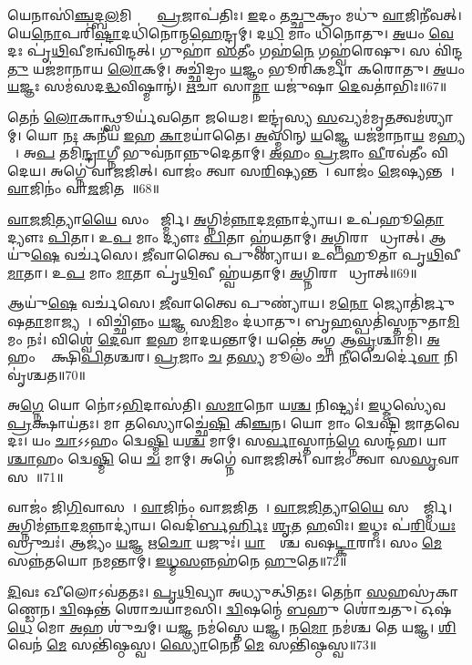 𑌯𑍇𑌨𑌾𑌸𑌿॑\ul{𑌞𑍍𑌚}𑌦𑍍𑌬\ul{𑌲}𑌮𑌿𑌨𑍍𑌦𑍍𑌰𑍇᳚ \ul{𑌪𑍍𑌰}𑌜𑌾𑌪॑𑌤𑌿𑌃।
\ul{𑌇}𑌦𑌂 𑌤\ul{𑌚𑍍𑌛𑍁}𑌕𑍍𑌰𑌂 𑌮𑌧𑍁॑ \ul{𑌵𑌾}𑌜𑌿𑌨𑍀॑𑌵𑌤𑍍।
𑌯𑍇\ul{𑌨𑍋}𑌪𑌰𑌿॑\ul{𑌷𑍍𑌟𑌾}𑌦𑌧𑌿॑𑌨𑍋𑌨𑍍𑌮\ul{𑌹𑍇}𑌨𑍍𑌦𑍍𑌰𑌮𑍍।
𑌦\ul{𑌧𑌿} 𑌮𑌾𑌂 𑌧𑌿॑𑌨𑍋𑌤𑍁।
\ul{𑌅}𑌯𑌂 \ul{𑌵𑍇}𑌦𑌃 𑌪𑍃॑\ul{𑌥𑌿}𑌵𑍀𑌮𑌨𑍍𑌵॑𑌵𑌿𑌨𑍍𑌦𑌤𑍍।
𑌗𑍁𑌹𑌾॑ \ul{𑌸}𑌤𑍀𑌂 𑌗𑌹॑\ul{𑌨𑍇} 𑌗𑌹𑍍𑌵॑𑌰𑍇𑌷𑍁।
𑌸 𑌵𑌿॑𑌨𑍍𑌦\ul{𑌤𑍁} 𑌯𑌜॑𑌮𑌾𑌨𑌾𑌯 \ul{𑌲𑍋}𑌕𑌮𑍍।
𑌅𑌚𑍍𑌛𑌿॑𑌦𑍍𑌰𑌂 \ul{𑌯}𑌜𑍍𑌞𑌂 𑌭𑍂𑌰𑌿॑𑌕𑌰𑍍𑌮𑌾 𑌕𑌰𑍋𑌤𑍁।
\ul{𑌅}𑌯𑌂 \ul{𑌯}𑌜𑍍𑌞𑌃 𑌸𑌮॑𑌸𑌦\ul{𑌦𑍍𑌧}𑌵𑌿𑌷𑍍𑌮𑌾𑌨𑍍॑।
\ul{𑌋}𑌚𑌾 𑌸𑌾\ul{𑌮𑍍𑌨𑌾} 𑌯𑌜𑍁॑𑌷𑌾 \ul{𑌦𑍇}𑌵𑌤𑌾॑𑌭𑌿𑌃॥67॥

𑌤𑍇𑌨॑ \ul{𑌲𑍋}𑌕𑌾𑌨𑍍𑌥𑍍𑌸𑍂𑌰𑍍𑌯॑𑌵𑌤𑍋 𑌜𑌯𑍇𑌮।
𑌇𑌨𑍍𑌦𑍍𑌰॑𑌸𑍍𑌯 \ul{𑌸}𑌖𑍍𑌯𑌮॑𑌮𑍃\ul{𑌤}𑌤𑍍𑌵𑌮॑𑌶𑍍𑌯𑌾𑌮𑍍।
𑌯𑍋 \ul{𑌨𑌃} 𑌕𑌨𑍀॑𑌯 \ul{𑌇}𑌹 \ul{𑌕𑌾}𑌮𑌯𑌾॑𑌤𑍈।
\ul{𑌅}𑌸𑍍𑌮𑌿𑌨𑍍 \ul{𑌯}𑌜𑍍𑌞𑍇 𑌯𑌜॑𑌮𑌾𑌨𑌾\ul{𑌯} 𑌮𑌹𑍍𑌯𑌮𑍍᳚।
𑌅\ul{𑌪} 𑌤𑌮𑌿॑\ul{𑌨𑍍𑌦𑍍𑌰𑌾}𑌗𑍍𑌨𑍀 𑌭𑍁𑌵॑𑌨𑌾𑌨𑍍𑌨𑍁𑌦𑍇𑌤𑌾𑌮𑍍।
\ul{𑌅}𑌹𑌂 \ul{𑌪𑍍𑌰}𑌜𑌾𑌂 \ul{𑌵𑍀}𑌰𑌵॑𑌤𑍀𑌂 𑌵𑌿𑌦𑍇𑌯।
𑌅𑌗𑍍𑌨𑍇॑ 𑌵𑌾𑌜𑌜𑌿𑌤𑍍।
𑌵𑌾𑌜𑌂॑ 𑌤𑍍𑌵𑌾 𑌸\ul{𑌰𑌿}𑌷𑍍𑌯𑌨𑍍𑌤𑌮𑍍᳚।
𑌵𑌾𑌜𑌂॑ \ul{𑌜𑍇}𑌷𑍍𑌯𑌨𑍍𑌤𑌮𑍍᳚।
\ul{𑌵𑌾}𑌜𑌿𑌨𑌂॑ 𑌵𑌾\ul{𑌜}𑌜𑌿𑌤𑌮𑍍᳚॥68॥

\ul{𑌵𑌾}\ul{𑌜}\ul{𑌜𑌿}𑌤𑍍𑌯𑌾\ul{𑌯𑍈} 𑌸𑌂 𑌮𑌾᳚𑌰𑍍𑌜𑍍𑌮𑌿।
\ul{𑌅}𑌗𑍍𑌨𑌿𑌮॑\ul{𑌨𑍍𑌨𑌾}𑌦\ul{𑌮}𑌨𑍍𑌨𑌾𑌦𑍍𑌯𑌾॑𑌯।
𑌉𑌪॑𑌹𑍂\ul{𑌤𑍋} 𑌦𑍍𑌯𑍗𑌃 \ul{𑌪𑌿}𑌤𑌾।
𑌉\ul{𑌪} 𑌮𑌾𑌂 𑌦𑍍𑌯𑍗𑌃 \ul{𑌪𑌿}𑌤𑌾 𑌹𑍍𑌵॑𑌯𑌤𑌾𑌮𑍍।
\ul{𑌅}𑌗𑍍𑌨𑌿𑌰𑌾𑌗𑍍𑌨𑍀᳚𑌧𑍍𑌰𑌾𑌤𑍍।
𑌆𑌯𑍁॑\ul{𑌷𑍇} 𑌵𑌰𑍍𑌚॑𑌸𑍇।
\ul{𑌜𑍀}𑌵𑌾𑌤𑍍𑌵𑍈 𑌪𑍁𑌣𑍍𑌯𑌾॑𑌯।
𑌉𑌪॑𑌹𑍂𑌤𑌾 𑌪𑍃\ul{𑌥𑌿}𑌵𑍀 \ul{𑌮𑌾}𑌤𑌾।
𑌉\ul{𑌪} 𑌮𑌾𑌂 \ul{𑌮𑌾}𑌤𑌾 𑌪𑍃॑\ul{𑌥𑌿}𑌵𑍀 𑌹𑍍𑌵॑𑌯𑌤𑌾𑌮𑍍।
\ul{𑌅}𑌗𑍍𑌨𑌿𑌰𑌾𑌗𑍍𑌨𑍀᳚𑌧𑍍𑌰𑌾𑌤𑍍॥69॥

𑌆𑌯𑍁॑\ul{𑌷𑍇} 𑌵𑌰𑍍𑌚॑𑌸𑍇।
\ul{𑌜𑍀}𑌵𑌾𑌤𑍍𑌵𑍈 𑌪𑍁𑌣𑍍𑌯𑌾॑𑌯।
𑌮\ul{𑌨𑍋} 𑌜𑍍𑌯𑍋𑌤𑌿॑𑌰𑍍𑌜𑍁𑌷\ul{𑌤𑌾}𑌮𑌾\-𑌜𑍍𑌯𑌮𑍍᳚।
𑌵𑌿𑌚𑍍𑌛𑌿॑𑌨𑍍𑌨𑌂 \ul{𑌯}𑌜𑍍𑌞 𑌸\ul{𑌮𑌿}𑌮𑌂 𑌦॑𑌧𑌾𑌤𑍁।
𑌬𑍃\ul{𑌹}𑌸𑍍𑌪𑌤𑌿॑𑌸𑍍𑌤𑌨𑍁𑌤𑌾\ul{𑌮𑌿}𑌮𑌂 𑌨𑌃॑।
𑌵𑌿𑌶𑍍𑌵𑍇॑ \ul{𑌦𑍇}𑌵𑌾 \ul{𑌇}𑌹 𑌮𑌾॑𑌦𑌯𑌨𑍍𑌤𑌾𑌮𑍍।
𑌯𑌨𑍍𑌤𑍇॑ 𑌅𑌗𑍍𑌨 𑌆\ul{𑌵𑍃}𑌶𑍍𑌚𑌾𑌮𑌿॑।
\ul{𑌅}𑌹𑌂 𑌵𑌾᳚ 𑌕𑍍𑌷𑌿\ul{𑌪𑌿}𑌤𑌶𑍍𑌚𑌰\sn{}।
\ul{𑌪𑍍𑌰}𑌜𑌾𑌂 \ul{𑌚} 𑌤\ul{𑌸𑍍𑌯} 𑌮𑍂𑌲𑌂॑ 𑌚।
\ul{𑌨𑍀}𑌚𑍈𑌰𑍍𑌦𑍇॑\ul{𑌵𑌾} 𑌨𑌿 𑌵𑍃॑𑌶𑍍𑌚𑌤॥70॥

𑌅\ul{𑌗𑍍𑌨𑍇} 𑌯𑍋 𑌨𑍋॑\-𑌽\ul{𑌭𑌿}𑌦𑌾𑌸॑𑌤𑌿।
\ul{𑌸}\ul{𑌮𑌾}𑌨𑍋 𑌯\ul{𑌶𑍍𑌚} 𑌨𑌿𑌷𑍍𑌟𑍍𑌯𑌃॑।
\ul{𑌇}𑌧𑍍𑌮𑌸𑍍𑌯𑍇॑𑌵 \ul{𑌪𑍍𑌰}𑌕𑍍𑌷𑌾𑌯॑𑌤𑌃।
𑌮𑌾 𑌤𑌸𑍍𑌯𑍋𑌚𑍍𑌛𑍇॑\ul{𑌷𑌿} 𑌕𑌿\ul{𑌞𑍍𑌚}𑌨।
𑌯𑍋 𑌮𑌾𑌂 𑌦𑍍𑌵𑍇𑌷𑍍𑌟𑌿॑ 𑌜𑌾𑌤𑌵𑍇𑌦𑌃।
𑌯𑌂 \ul{𑌚𑌾}𑌽𑌽𑌹𑌂 𑌦𑍍𑌵𑍇\ul{𑌷𑍍𑌮𑌿} 𑌯\ul{𑌶𑍍𑌚} 𑌮𑌾𑌮𑍍।
𑌸\ul{𑌰𑍍𑌵𑌾}\ul{}𑌸𑍍𑌤𑌾𑌨॑\ul{𑌗𑍍𑌨𑍇} 𑌸𑌨𑍍𑌦॑𑌹।
𑌯𑌾\ul{𑌶𑍍𑌚𑌾}𑌹𑌂 𑌦𑍍𑌵𑍇\ul{𑌷𑍍𑌮𑌿} 𑌯𑍇 \ul{𑌚} 𑌮𑌾𑌮𑍍।
𑌅𑌗𑍍𑌨𑍇॑ 𑌵𑌾𑌜𑌜𑌿𑌤𑍍।
𑌵𑌾𑌜𑌂॑ 𑌤𑍍𑌵𑌾 𑌸\ul{𑌸𑍃}𑌵𑌾𑌸𑌮𑍍᳚॥71॥

𑌵𑌾𑌜𑌂॑ 𑌜𑌿\ul{𑌗𑌿}𑌵𑌾𑌸𑌮𑍍᳚।
\ul{𑌵𑌾}𑌜𑌿𑌨𑌂॑ 𑌵𑌾\ul{𑌜}𑌜𑌿𑌤𑌮𑍍᳚।
\ul{𑌵𑌾}\ul{𑌜}\ul{𑌜𑌿}𑌤𑍍𑌯𑌾\ul{𑌯𑍈} 𑌸𑌮𑍍𑌮𑌾᳚𑌰𑍍𑌜𑍍𑌮𑌿।
\ul{𑌅}𑌗𑍍𑌨𑌿𑌮॑\ul{𑌨𑍍𑌨𑌾}𑌦\ul{𑌮}𑌨𑍍𑌨𑌾𑌦𑍍𑌯𑌾॑𑌯।
𑌵𑍇𑌦𑌿॑\ul{𑌰𑍍𑌬}\ul{𑌰𑍍}𑌹𑌿𑌃 \ul{𑌶𑍃}𑌤 \ul{𑌹}𑌵𑌿𑌃।
\ul{𑌇}𑌧𑍍𑌮𑌃 𑌪॑\ul{𑌰𑌿}𑌧\ul{𑌯𑌃} 𑌸𑍍𑌰𑍁𑌚𑌃॑।
𑌆𑌜𑍍𑌯𑌂॑ \ul{𑌯}𑌜𑍍𑌞 𑌋\ul{𑌚𑍋} 𑌯𑌜𑍁𑌃॑।
\ul{𑌯𑌾}𑌜𑍍𑌯𑌾᳚𑌶𑍍𑌚 𑌵𑌷\ul{𑌟𑍍𑌕𑌾}𑌰𑌾𑌃।
𑌸𑌂 \ul{𑌮𑍇} 𑌸𑌨𑍍𑌨॑𑌤𑌯𑍋 𑌨𑌮𑌨𑍍𑌤𑌾𑌮𑍍।
\ul{𑌇}\ul{𑌧𑍍𑌮}\ul{𑌸}𑌨𑍍𑌨𑌹॑𑌨𑍇 \ul{𑌹𑍁}𑌤𑍇॥72॥

\ul{𑌦𑌿}𑌵𑌃 𑌖𑍀𑌲𑍋\-𑌽𑌵॑𑌤𑌤𑌃।
\ul{𑌪𑍃}\ul{𑌥𑌿}𑌵𑍍𑌯𑌾 𑌅𑌧𑍍𑌯𑍁𑌤𑍍𑌥𑌿॑𑌤𑌃।
𑌤𑍇𑌨𑌾॑ \ul{𑌸}𑌹𑌸𑍍𑌰॑𑌕𑌾𑌣𑍍𑌡𑍇𑌨।
\ul{𑌦𑍍𑌵𑌿}𑌷𑌨𑍍𑌤॑ 𑌶𑍋𑌚𑌯𑌾𑌮𑌸𑌿।
\ul{𑌦𑍍𑌵𑌿}𑌷𑌨𑍍𑌮𑍇॑ \ul{𑌬}𑌹𑍁 𑌶𑍋॑𑌚𑌤𑍁।
𑌓𑌷॑\ul{𑌧𑍇} 𑌮𑍋 \ul{𑌅}𑌹 𑌶𑍁॑𑌚𑌮𑍍।
𑌯\ul{𑌜𑍍𑌞} 𑌨𑌮॑𑌸𑍍𑌤𑍇 𑌯𑌜𑍍𑌞।
𑌨\ul{𑌮𑍋} 𑌨𑌮॑𑌶𑍍𑌚 𑌤𑍇 𑌯𑌜𑍍𑌞।
\ul{𑌶𑌿}𑌵𑍇𑌨॑ \ul{𑌮𑍇} 𑌸𑌨𑍍𑌤𑌿॑𑌷𑍍𑌠𑌸𑍍𑌵।
\ul{𑌸𑍍𑌯𑍋}𑌨𑍇𑌨॑ \ul{𑌮𑍇} 𑌸𑌨𑍍𑌤𑌿॑𑌷𑍍𑌠𑌸𑍍𑌵॥73॥

